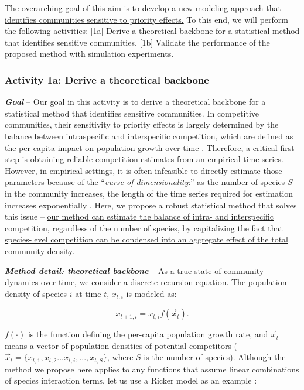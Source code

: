 \documentclass[12pt, class=article, crop=false]{standalone}
\begin{document}
\ul{The overarching goal of this aim is to develop a new modeling approach that identifies communities sensitive to priority effects.}
To this end, we will perform the following activities:
[1a] Derive a theoretical backbone for a statistical method that identifies sensitive communities.
[1b] Validate the performance of the proposed method with simulation experiments.

\subsubsection*{Activity 1a: Derive a theoretical backbone}

\textbf{\textit{Goal}} -- 
Our goal in this activity is to derive a theoretical backbone for a statistical method that identifies sensitive communities.
In competitive communities, their sensitivity to priority effects is largely determined by the balance between intraspecific and interspecific competition, which are defined as the per-capita impact on population growth over time \citep{chesson_mechanisms_2000, barabas_chessons_2018, ke_coexistence_2018, terui_intentional_2023}.
Therefore, a critical first step is obtaining reliable competition estimates from an empirical time series.
However, in empirical settings, it is often infeasible to directly estimate those parameters because of the ``\textit{curse of dimensionality}:'' as the number of species $S$ in the community increases, the length of the time series required for estimation increases exponentially \citep{ovaskainen_how_2017}.
Here, we propose a robust statistical method that solves this issue -- \ul{our method can estimate the balance of intra- and interspecific competition, regardless of the number of species, by capitalizing the fact that species-level competition can be condensed into an aggregate effect of the total community density}.

\textbf{\textit{Method detail: theoretical backbone}} -- 
As a true state of community dynamics over time, we consider a discrete recursion equation. The population density of species $i$ at time $t$, $x_{t,i}$ is modeled as:

\begin{equation}
\label{eq:m0}
x_{t + 1, i} = x_{t, i} f(\overset{\rightarrow}{x}_{t}).
\end{equation}

$f(\cdot)$ is the function defining the per-capita population growth rate, and $\overset{\rightarrow}{x}_{t}$ means a vector of population densities of potential competitors ($\overset{\rightarrow}{x}_{t} = \{x_{t,1}, x_{t,2}...x_{t,i},...,x_{t,S}\}$, where $S$ is the number of species).
Although the method we propose here applies to any functions that assume linear combinations of species interaction terms, let us use a Ricker model as an example \citep{ricker_stock_1954, fowler_species_2012, terui_intentional_2023}:
\end{document}
